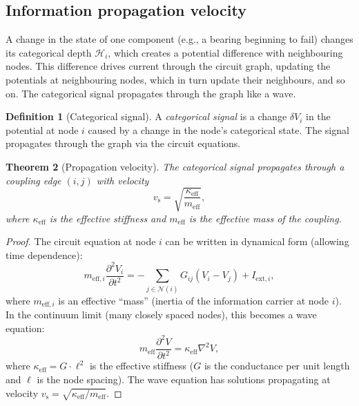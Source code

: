 \documentclass[twocolumn,10pt,a4paper]{article}
\newtheorem{theorem}{Theorem}[section]
\theoremstyle{definition}
\newtheorem{definition}[theorem]{Definition}
\theoremstyle{remark}
\newcommand{\vs}{v_{\mathrm{s}}}
\begin{document}
\subsection{Information propagation velocity}

A change in the state of one component (e.g., a bearing beginning to fail) changes its categorical depth $\mathcal{H}_i$, which creates a potential difference with neighbouring nodes. This difference drives current through the circuit graph, updating the potentials at neighbouring nodes, which in turn update their neighbours, and so on. The categorical signal propagates through the graph like a wave.

\begin{definition}[Categorical signal]\label{def:categorical_signal}
A \emph{categorical signal} is a change $\delta V_i$ in the potential at node $i$ caused by a change in the node's categorical state. The signal propagates through the graph via the circuit equations.
\end{definition}

\begin{theorem}[Propagation velocity]\label{thm:propagation_velocity}
The categorical signal propagates through a coupling edge $(i, j)$ with velocity
\begin{equation}\label{eq:signal_velocity}
\vs = \sqrt{\frac{\kappa_{\mathrm{eff}}}{m_{\mathrm{eff}}}},
\end{equation}
where $\kappa_{\mathrm{eff}}$ is the effective stiffness and $m_{\mathrm{eff}}$ is the effective mass of the coupling.
\end{theorem}

\begin{proof}
The circuit equation at node $i$ can be written in dynamical form (allowing time dependence):
\begin{equation}\label{eq:dynamic_circuit}
m_{\mathrm{eff},i} \frac{\partial^2 V_i}{\partial t^2} = -\sum_{j \in \mathcal{N}(i)} G_{ij}(V_i - V_j) + I_{\mathrm{ext},i},
\end{equation}
where $m_{\mathrm{eff},i}$ is an effective ``mass'' (inertia of the information carrier at node $i$). In the continuum limit (many closely spaced nodes), this becomes a wave equation:
\begin{equation}\label{eq:wave_equation}
m_{\mathrm{eff}} \frac{\partial^2 V}{\partial t^2} = \kappa_{\mathrm{eff}} \nabla^2 V,
\end{equation}
where $\kappa_{\mathrm{eff}} = G \cdot \ell^2$ is the effective stiffness ($G$ is the conductance per unit length and $\ell$ is the node spacing). The wave equation has solutions propagating at velocity $\vs = \sqrt{\kappa_{\mathrm{eff}}/m_{\mathrm{eff}}}$.
\end{proof}
\end{document}
